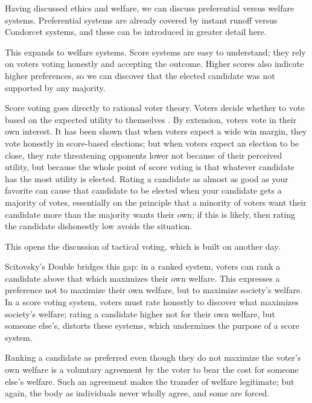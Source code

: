Having discussed ethics and welfare, we can discuss preferential versus welfare systems.  Preferential systems are already covered by instant runoff versus Condorcet systems, and these can be introduced in greater detail here.

This expands to welfare systems.  Score systems are easy to understand; they rely on voters voting honestly and accepting the outcome.  Higher scores also indicate higher preferences, so we can discover that the elected candidate was not supported by any majority.

Score voting goes directly to rational voter theory.  Voters decide whether to vote based on the expected utility to themselves \autocite[p54]{Heckelman2015}.  By extension, voters vote in their own interest.  It has been shown \autocite{Feddersen2009} that when voters expect a wide win margin, they vote honestly in score-based elections; but when voters expect an election to be close, they rate threatening opponents lower not because of their perceived utility, but because the whole point of score voting is that whatever candidate has the most utility is elected.  Rating a candidate as almost as good as your favorite can cause that candidate to be elected when your candidate gets a majority of votes, essentially on the principle that a minority of voters want their candidate more than the majority wants their own; if this is likely, then rating the candidate dishonestly low avoids the situation.

This opens the discussion of tactical voting, which is built on another day.

Scitovsky's Double bridges this gap:  in a ranked system, voters can rank a candidate above that which maximizes their own welfare.  This expresses a preference not to maximize their own welfare, but to maximize society's welfare.  In a score voting system, voters must rate honestly to discover what maximizes society's welfare; rating a candidate higher not for their own welfare, but someone else's, distorts these systems, which undermines the purpose of a score system.

Ranking a candidate as preferred even though they do not maximize the voter's own welfare is a voluntary agreement by the voter to bear the cost for someone else's welfare.  Such an agreement makes the transfer of welfare legitimate; but again, the body as individuals never wholly agree, and some are forced.

